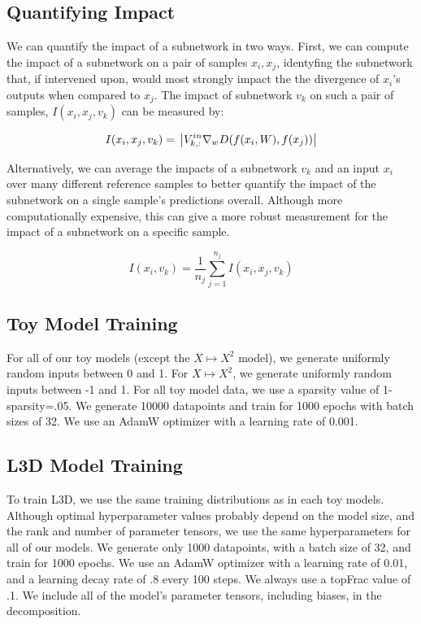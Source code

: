 \documentclass{article}
\theoremstyle{plain}
\theoremstyle{definition}
\theoremstyle{remark}
\begin{document}
\subsection{Quantifying Impact}\label{sec:impact}

We can quantify the impact of a subnetwork in two ways. First, we can compute the impact of a subnetwork on a pair of samples $x_i, x_j$, identyfing the subnetwork that, if intervened upon, would most strongly impact the the divergence of $x_i$'s outputs when compared to $x_j$. The impact of subnetwork $v_k$ on such a pair of samples, $I(x_i, x_j, v_k)$ can be measured by:

\begin{equation}
    I(x_i, x_j, v_k) = \\
    \left| V^{in}_{k,:} \nabla_w D(f(x_i, W), f(x_j)) \right|
\end{equation}

Alternatively, we can average the impacts of a subnetwork $v_k$ and an input $x_i$ over many different reference samples to better quantify the impact of the subnetwork on a single sample's predictions overall. Although more computationally expensive, this can give a more robust measurement for the impact of a subnetwork on a specific sample. 

\begin{equation}
    I(x_i, v_k) = \frac{1}{n_j} \sum_{j=1}^{n_j} I(x_i, x_j, v_k)
\end{equation}


\subsection{Toy Model Training}\label{sec:toymodel_hyperparams}

For all of our toy models (except the $X \mapsto X^2$ model), we generate uniformly random inputs between 0 and 1. For $X \mapsto X^2$, we generate uniformly random inputs between -1 and 1. For all toy model data, we use a sparsity value of 1-sparsity=.05. We generate 10000 datapoints and train for 1000 epochs with batch sizes of 32. We use an AdamW optimizer with a learning rate of 0.001. 

\subsection{L3D Model Training}\label{sec:L3D_hyperparams}

To train L3D, we use the same training distributions as in each toy models. Although optimal hyperparameter values probably depend on the model size, and the rank and number of parameter tensors, we use the same hyperparameters for all of our models. We generate only 1000 datapoints, with a batch size of 32, and train for 1000 epochs. We use an AdamW optimizer with a learning rate of 0.01, and a learning decay rate of .8 every 100 steps. We always use a topFrac value of .1.  We include all of the model's parameter tensors, including biases, in the decomposition. 
\end{document}
